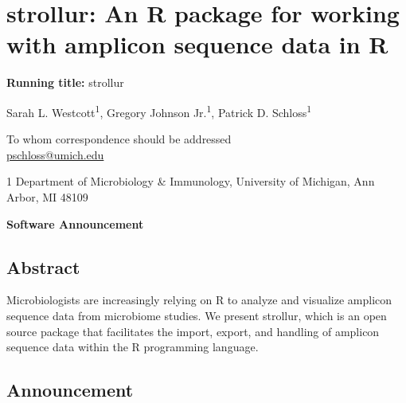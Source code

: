 \documentclass[
  11pt,
]{article}
\author{}
\date{}
\begin{document}
\raggedright

\section{strollur: An R package for working with amplicon sequence data
in
R}\label{strollur-an-r-package-for-working-with-amplicon-sequence-data-in-r}

\vspace{20mm}

\textbf{Running title:} strollur

\vspace{20mm}

Sarah L. Westcott\textsuperscript{1}, Gregory Johnson
Jr.\textsuperscript{1}, Patrick D. Schloss\textsuperscript{1\textdagger}

\vspace{25mm}

\textdagger To whom correspondence should be addressed\\
\href{mailto:pschloss@umich.edu}{pschloss@umich.edu}

\vspace{10mm}

1 Department of Microbiology \& Immunology, University of Michigan, Ann
Arbor, MI 48109

\vspace{20mm}

\textbf{Software Announcement}

\newpage

\subsection{Abstract}\label{abstract}

Microbiologists are increasingly relying on R to analyze and visualize
amplicon sequence data from microbiome studies. We present strollur,
which is an open source package that facilitates the import, export, and
handling of amplicon sequence data within the R programming language.

\newpage

\subsection{Announcement}\label{announcement}
\end{document}
